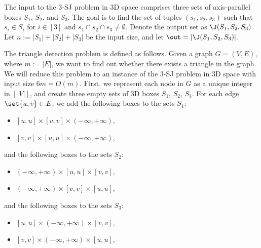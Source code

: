 The input to the 3-SJ problem in 3D space comprises
 three sets of axis-parallel boxes $S_1$, $S_2$, and $S_3$. 
The goal is to find the set of tuples $(s_1,s_2,s_3)$ such that $s_i \in S_i$ for $i \in [3]$ and $s_1 \cap s_2 \cap s_3 \neq \emptyset$. Denote the output set as $\J(S_1,S_2,S_3)$.
Let $n:=|S_1|+|S_2|+|S_3|$ be the input size, and let $\out = |\J(S_1,S_2,S_3)|$.

The triangle detection problem is defined as follows. Given a graph $G = (V,E)$, where $m:=|E|$, we want to find out whether there exists a triangle in the graph. We will reduce this problem to an instance of the 3-SJ problem in 3D space with input size $6m=O(m)$. First, we represent each node in $G$ as a unique integer in $[|V|]$, and create three empty sets of 3D boxes $S_1$, $S_2$, $S_3$. For each edge $\set{u,v}\in E$, we add the following boxes to the sets $S_1$:
\begin{itemize}
    \item $[u,u]\times [v,v]\times(-\infty,+\infty)$,
    \item $[v,v]\times [u,u] \times (-\infty,+\infty)$,
\end{itemize}
and the following boxes to the sets $S_2$:
\begin{itemize}
    \item $(-\infty,+\infty)\times[u,u]\times [v,v]$,
    \item $(-\infty,+\infty) \times[v,v]\times [u,u]$,
\end{itemize}
and the following boxes to the sets $S_3$:
\begin{itemize}
    \item $[u,u]\times(-\infty,+\infty)\times [v,v]$,
    \item $[v,v]\times(-\infty,+\infty)\times [u,u]$,
\end{itemize}

